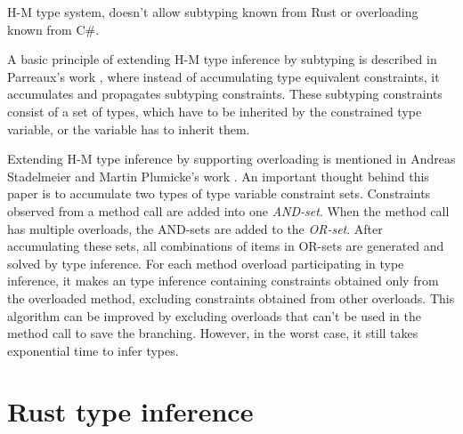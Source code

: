 H-M type system, doesn't allow subtyping known from Rust or overloading known from C\#.  
\par
A basic principle of extending H-M type inference by subtyping is described in Parreaux's work \cite{paper:Parreaux}, where instead of accumulating type equivalent constraints, it accumulates and propagates subtyping constraints.
These subtyping constraints consist of a set of types, which have to be inherited by the constrained type variable, or the variable has to inherit them.
\par
Extending H-M type inference by supporting overloading is mentioned in Andreas Stadelmeier and Martin Plumicke's work \cite{paper:Overloading}.
An important thought behind this paper is to accumulate two types of type variable constraint sets.
Constraints observed from a method call are added into one \textit{AND-set}.
When the method call has multiple overloads, the AND-sets are added to the \textit{OR-set}.
After accumulating these sets, all combinations of items in OR-sets are generated and solved by type inference.
For each method overload participating in type inference, it makes an type inference containing constraints obtained only from the overloaded method, excluding constraints obtained from other overloads.
This algorithm can be improved by excluding overloads that can't be used in the method call to save the branching.
However, in the worst case, it still takes exponential time to infer types.

\section{Rust type inference}

